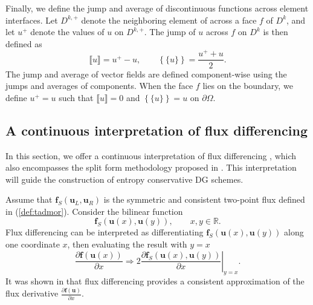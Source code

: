 \documentclass[preprint,10pt]{elsarticle}
\theoremstyle{definition}
\theoremstyle{lemma}
\theoremstyle{theorem}
\theoremstyle{assumption}
\newcommand{\pd}[2]{\frac{\partial#1}{\partial#2}}
\newcommand{\LRp}[1]{\left( #1 \right)}
\newcommand{\LRc}[1]{\left\{ #1 \right\}}
\newcommand{\jump}[1] {\ensuremath{\llbracket#1\rrbracket}}
\newcommand{\avg}[1] {\ensuremath{\LRc{\!\{#1\}\!}}}
\newcommand{\note}[1]{{\color{blue}{#1}}}
\begin{document}

Finally, we define the jump and average of discontinuous functions across element interfaces.  Let $D^{k,+}$ denote the neighboring element of across a face $f$ of $D^k$, and let $u^+$ denote the values of $u$ on $D^{k,+}$.  The jump of $u$ across $f$ on $D^k$ is then defined as
\[
\jump{u} = u^+ - u, \qquad \avg{u} = \frac{u^+ + u}{2}.
\]
The jump and average of vector fields are defined component-wise using the jumps and averages of components.  When the face $f$ lies on the boundary, we define $u^+ = u$ such that $\jump{u} = 0$ and $\avg{u} = u$ on $\partial \Omega$.


\subsection{A continuous interpretation of flux differencing}

In this section, we offer a continuous interpretation of flux differencing \cite{fisher2013high,gassner2017br1,chen2017entropy}, which also encompasses the split form methodology proposed in \cite{gassner2016split}.  This interpretation will guide the construction of entropy conservative DG schemes.  

Assume that $\bm{f}_S(\bm{u}_L,\bm{u}_R)$ is the symmetric and consistent two-point flux defined in (\ref{def:tadmor}).  Consider the bilinear function
\[
\bm{f}_S\LRp{\bm{u}(x),\bm{u}(y)}, \qquad x, y \in \mathbb{R}.  
\]
Flux differencing can be interpreted as differentiating $\bm{f}_S\LRp{\bm{u}(x),\bm{u}(y)}$ along one coordinate $x$, then evaluating the result with $y=x$
\begin{equation}
\pd{\bm{f}(\bm{u}(x))}{x} \Longrightarrow 2\left.\pd{\bm{f}_S\LRp{\bm{u}(x),\bm{u}(y)}}{x}\right|_{y=x}.
\label{eq:fluxdiff}
\end{equation}
It was shown in \cite{chen2017entropy} that flux differencing provides a consistent approximation of the flux derivative $\pd{\bm{f}(\bm{u})}{x}$.  

\end{document}
